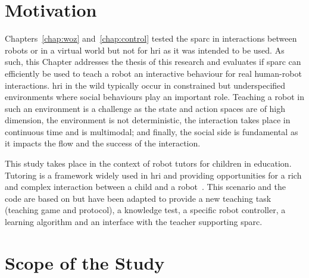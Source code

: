 \newpage

\section{Motivation}

Chapters~\ref{chap:woz} and~\ref{chap:control} tested the \gls{sparc} in interactions between robots or in a virtual world but not for \gls{hri} as it was intended to be used. As such, this Chapter addresses the thesis of this research and evaluates if \gls{sparc} can efficiently be used to teach a robot an interactive behaviour for real human-robot interactions. \gls{hri} in the wild typically occur in constrained but underspecified environments where social behaviours play an important role. Teaching a robot in such an environment is a challenge as the state and action spaces are of high dimension, the environment is not deterministic, the interaction takes place in continuous time and is multimodal; and finally, the social side is fundamental as it impacts the flow and the success of the interaction.

This study takes place in the context of robot tutors for children in education. Tutoring is a framework widely used in \gls{hri} and providing opportunities for a rich and complex interaction between a child and a robot~\citep{leyzberg2012physical,kennedy2015robot}. This scenario and the code are based on \cite{lemaignan2017free} but have been adapted to provide a new teaching task (teaching game and protocol), a knowledge test, a specific robot controller, a learning algorithm and an interface with the teacher supporting \gls{sparc}.


\section{Scope of the Study} \label{sec:tutoring_scope}

